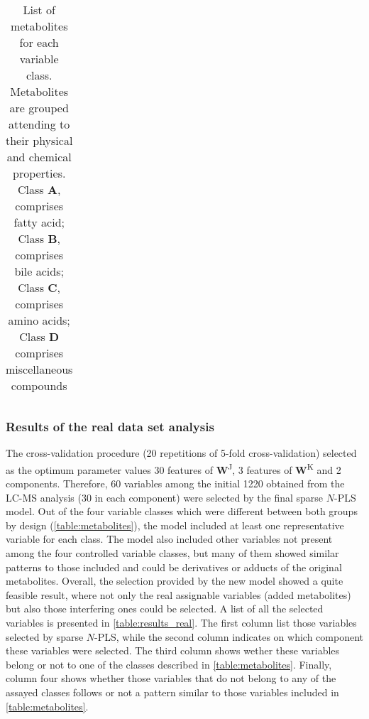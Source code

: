 \begin{table}[hbtp]
{\begin{tabular}{@{}cc@{}}
\end{tabular}}
\caption[List of metabolites for each variable class in the real metabolomics data set used for validation]{List of metabolites for each variable class. Metabolites are grouped attending to their physical and chemical properties. Class \textbf{A}, comprises fatty acid; Class \textbf{B}, comprises bile acids; Class \textbf{C}, comprises amino acids; Class \textbf{D} comprises miscellaneous compounds}
\label{table:metabolites}
\end{table}

\subsubsection{Results of the real data set analysis}
The cross-validation procedure (20 repetitions of 5-fold cross-validation) selected as the optimum parameter values 30 features of \textbf{W}\textsuperscript{J}, 3 features of \textbf{W}\textsuperscript{K} and 2 components. Therefore, 60 variables among the initial 1220 obtained from the LC-MS analysis (30 in each component) were selected by the final sparse $N$-PLS model. Out of the four variable classes which were different between both groups by design (\autoref{table:metabolites}), the model included at least one representative variable for each class. The model also included other variables not present among the four controlled variable classes, but many of them showed similar patterns to those included and could be derivatives or adducts of the original metabolites. Overall, the selection provided by the new model showed a quite feasible result, where not only the real assignable variables (added metabolites) but also those interfering ones could be selected. A list of all the selected variables is presented in \autoref{table:results_real}. The first column list those variables selected by sparse $N$-PLS, while  the second column indicates on which component these variables were selected. The third column shows wether these variables belong or not to one of the classes described in \autoref{table:metabolites}. Finally, column four shows whether those variables that do not belong to any of the assayed classes follows or not a pattern similar to those variables included in \autoref{table:metabolites}. 
\vspace{10pt}
